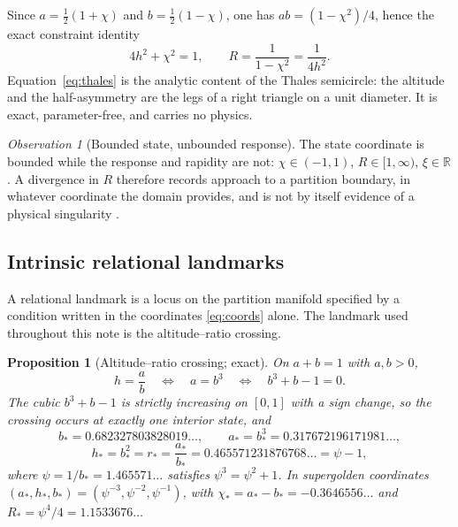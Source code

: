 \documentclass[11pt,a4paper]{article}
\theoremstyle{definition}
\theoremstyle{plain}
\newtheorem{proposition}[definition]{Proposition}
\theoremstyle{remark}
\newtheorem{observation}[definition]{Observation}
\newcommand{\Rresp}{R}
\begin{document}
Since $a=\tfrac12(1+\chi)$ and $b=\tfrac12(1-\chi)$, one has
$ab=(1-\chi^{2})/4$, hence the exact constraint identity
\begin{equation}
4h^{2}+\chi^{2}=1,
\qquad
\Rresp=\frac{1}{1-\chi^{2}}=\frac{1}{4h^{2}} .
\label{eq:thales}
\end{equation}
Equation~\eqref{eq:thales} is the analytic content of the Thales semicircle:
the altitude and the half-asymmetry are the legs of a right triangle on a unit
diameter. It is exact, parameter-free, and carries no physics.

\begin{observation}[Bounded state, unbounded response]
The state coordinate is bounded while the response and rapidity are not:
$\chi\in(-1,1)$, $\Rresp\in[1,\infty)$, $\xi\in\mathbb{R}$. A divergence in
$\Rresp$ therefore records approach to a partition boundary, in whatever
coordinate the domain provides, and is not by itself evidence of a physical
singularity \cite{TwoFace}.
\end{observation}

\subsection{Intrinsic relational landmarks}

A relational landmark is a locus on the partition manifold specified by a
condition written in the coordinates \eqref{eq:coords} alone. The landmark used
throughout this note is the altitude--ratio crossing.

\begin{proposition}[Altitude--ratio crossing; exact]
\label{prop:crossing}
On $a+b=1$ with $a,b>0$,
\begin{equation}
h=\frac{a}{b}
\quad\Longleftrightarrow\quad
a=b^{3}
\quad\Longleftrightarrow\quad
b^{3}+b-1=0 .
\label{eq:crossing}
\end{equation}
The cubic $b^{3}+b-1$ is strictly increasing on $[0,1]$ with a sign change, so
the crossing occurs at exactly one interior state, and
\begin{equation}
b_{*}=0.682327803828019\ldots,\qquad
a_{*}=b_{*}^{3}=0.317672196171981\ldots,
\end{equation}
\begin{equation}
h_{*}=b_{*}^{2}=r_{*}=\frac{a_{*}}{b_{*}}
=0.465571231876768\ldots=\psi-1,
\end{equation}
where $\psi=1/b_{*}=1.465571\ldots$ satisfies $\psi^{3}=\psi^{2}+1$. In
supergolden coordinates $(a_{*},h_{*},b_{*})=(\psi^{-3},\psi^{-2},\psi^{-1})$,
with $\chi_{*}=a_{*}-b_{*}=-0.3646556\ldots$ and
$\Rresp_{*}=\psi^{4}/4=1.1533676\ldots$
\end{proposition}
\end{document}
